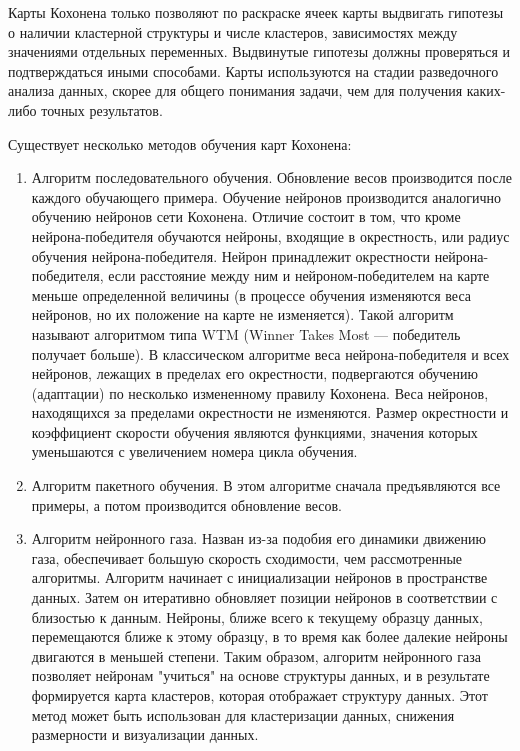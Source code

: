 \documentclass[bachelor, och, referat]{SCWorks}
\begin{document}
Карты Кохонена только позволяют по раскраске ячеек карты выдвигать
гипотезы о наличии кластерной структуры и числе кластеров, зависимостях
между значениями отдельных переменных. Выдвинутые гипотезы должны
проверяться и подтверждаться иными способами. Карты используются на
стадии разведочного анализа данных, скорее для общего понимания задачи,
чем для получения каких-либо точных результатов. 

Существует несколько методов обучения карт Кохонена:
\begin{enumerate}
    \item Алгоритм последовательного обучения. Обновление весов
    производится после каждого обучающего примера. Обучение нейронов
    производится аналогично обучению нейронов сети Кохонена. Отличие
    состоит в том, что кроме нейрона-победителя обучаются нейроны, входящие
    в окрестность, или радиус обучения нейрона-победителя.
    Нейрон принадлежит окрестности нейрона-победителя,
    если расстояние между ним и нейроном-победителем на карте меньше
    определенной величины (в процессе обучения изменяются веса нейронов, но
    их положение на карте не изменяется). Такой алгоритм называют алгоритмом
    типа WTM (Winner Takes Most — победитель получает больше). В
    классическом алгоритме веса нейрона-победителя и всех нейронов, лежащих
    в пределах его окрестности, подвергаются обучению (адаптации) по
    несколько измененному правилу Кохонена. Веса нейронов, находящихся
    за пределами окрестности не изменяются. Размер окрестности и
    коэффициент скорости обучения являются функциями, значения которых
    уменьшаются с увеличением номера цикла обучения. 

    \item Алгоритм пакетного обучения. В этом алгоритме сначала предъявляются все
    примеры, а потом производится обновление весов.

    \item Алгоритм нейронного газа. Назван из-за подобия его
    динамики движению газа, обеспечивает большую скорость сходимости, чем
    рассмотренные алгоритмы. Алгоритм начинает с инициализации нейронов в пространстве данных. Затем он итеративно обновляет позиции нейронов в соответствии с близостью к данным. Нейроны, ближе всего к текущему образцу данных, перемещаются ближе к этому образцу, в то время как более далекие нейроны двигаются в меньшей степени.
    Таким образом, алгоритм нейронного газа позволяет нейронам "учиться" на основе структуры данных, и в результате формируется карта кластеров, которая отображает структуру данных. Этот метод может быть использован для кластеризации данных, снижения размерности и визуализации данных.
\end{enumerate}
\end{document}
